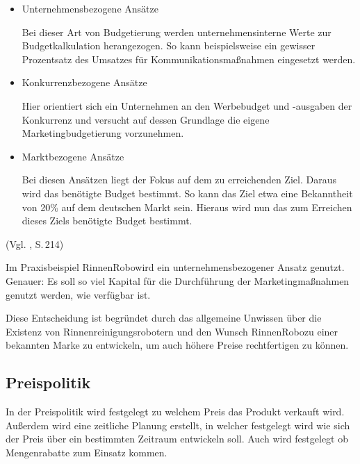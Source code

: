             \begin{itemize}
                \item Unternehmensbezogene Ansätze
                    
                    Bei dieser Art von Budgetierung werden unternehmensinterne Werte zur Budgetkalkulation herangezogen. So kann
                    beispielsweise ein gewisser Prozentsatz des Umsatzes für Kommunikationsmaßnahmen eingesetzt werden.
        
                \item Konkurrenzbezogene Ansätze
                
                    Hier orientiert sich ein Unternehmen an den Werbebudget und -ausgaben der Konkurrenz und versucht auf dessen
                    Grundlage die eigene Marketingbudgetierung vorzunehmen.
        
                \item Marktbezogene Ansätze
                
                    Bei diesen Ansätzen liegt der Fokus auf dem zu erreichenden Ziel. Daraus wird das benötigte Budget bestimmt.
                    So kann das Ziel etwa eine Bekanntheit von 20\% auf dem deutschen Markt sein. Hieraus wird nun das zum
                    Erreichen dieses Ziels benötigte Budget bestimmt.
            \end{itemize} (Vgl. \cite{Bruhn2014a}, S.\,214)
        
            \noindent
            Im Praxisbeispiel \as RinnenRobo\adl wird ein unternehmensbezogener Ansatz genutzt. Genauer: Es soll so viel
            Kapital für die Durchführung der Marketingmaßnahmen genutzt werden, wie verfügbar ist.
        
            \noindent
            Diese Entscheidung ist begründet durch das allgemeine Unwissen über die Existenz von Rinnenreinigungsrobotern und
            den Wunsch \as RinnenRobo\adl zu einer bekannten Marke zu entwickeln, um auch höhere Preise rechtfertigen zu
            können.        

 \subsection{Preispolitik}
    In der Preispolitik wird festgelegt zu welchem Preis das Produkt verkauft wird. Außerdem wird eine zeitliche Planung 
    erstellt, in welcher festgelegt wird wie sich der Preis über ein bestimmten Zeitraum entwickeln soll. Auch wird 
    festgelegt ob Mengenrabatte zum Einsatz kommen. 

